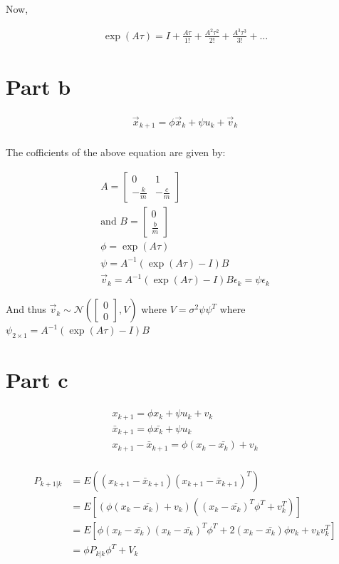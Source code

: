 \documentclass[12pt]{article}
\begin{document}
Now, 

\begin{eqnarray*}
\exp(A\tau) = I + \frac{A\tau}{1!} + \frac{A^2\tau^2}{2!} + \frac{A^3\tau^3}{3!} + \dots 
\end{eqnarray*}

\section{Part b}
\begin{eqnarray*}
\vec{x}_{k+1} = \phi \vec{x}_k + \psi u_k + \vec{v}_k\\
\end{eqnarray*}

The cofficients of the above equation are given by:

\begin{eqnarray*}
A = \begin{bmatrix} 0 & 1\\ -\frac{k}{m} & -\frac{c}{m}\end{bmatrix}\\
\text{and } B = \begin{bmatrix} 0 \\ \frac{b}{m} \end{bmatrix} \\
\phi = \exp(A\tau)\\
\psi = A^{-1}(\exp(A\tau)-I)B\\
\vec{v}_k =  A^{-1}(\exp(A\tau)-I)B\epsilon_k = \psi \epsilon_k
\end{eqnarray*}

And thus $\vec{v}_k \sim \mathcal{N}(\begin{bmatrix} 0 \\ 0 \end{bmatrix}, V)$  where $V = \sigma^2 \psi \psi^T$ where $\psi_{2 \times 1} = A^{-1}(\exp(A\tau)-I)B$


\section{Part c}
\begin{eqnarray*}
x_{k+1} = \phi x_k + \psi u_k + v_k\\
\bar{x}_{k+1} = \phi \bar{x_k} + \psi u_k \\
x_{k+1} - \bar{x}_{k+1} = \phi (x_k-\bar{x_k}) + v_k\\
\end{eqnarray*}

\begin{align*}
P_{k+1|k} &= E((x_{k+1} - \bar{x}_{k+1})(x_{k+1} - \bar{x}_{k+1})^T)\\
&= E[(\phi (x_k-\bar{x_k}) + v_k)((x_k-\bar{x_k})^T\phi^T  + v_k^T)]\\
&= E[\phi(x_k-\bar{x_k})(x_k-\bar{x_k})^T\phi^T + 2(x_k-\bar{x_k})\phi v_k + v_k v_k^T]\\
&= \phi P_{k|k} \phi^T + V_k
\end{align*}
\end{document}
